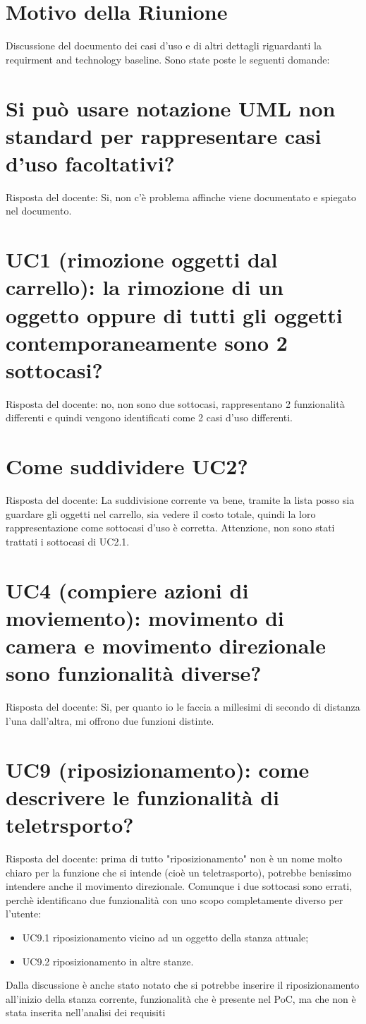 \section{Motivo della Riunione}
Discussione del documento dei casi d'uso e di altri dettagli riguardanti la requirment and technology baseline. Sono state poste le seguenti domande:

\section{Si può usare notazione UML non standard per rappresentare casi d'uso facoltativi?}
Risposta del docente: Si, non c'è problema affinche viene documentato e spiegato nel documento.

\section{UC1 (rimozione oggetti dal carrello): la rimozione di un oggetto oppure di tutti gli oggetti contemporaneamente sono 2 sottocasi?}
Risposta del docente: no, non sono due sottocasi, rappresentano 2 funzionalità differenti e quindi vengono identificati come 2 casi d'uso differenti.

\section{Come suddividere UC2?}
Risposta del docente: La suddivisione corrente va bene, tramite la lista posso sia guardare gli oggetti nel carrello, sia vedere il costo totale, quindi la loro rappresentazione come sottocasi d'uso è corretta. Attenzione, non sono stati trattati i sottocasi di UC2.1.

\section{UC4 (compiere azioni di moviemento): movimento di camera e movimento direzionale sono funzionalità diverse?}
Risposta del docente: Si, per quanto io le faccia a millesimi di secondo di distanza l'una dall'altra, mi offrono due funzioni distinte.

\section{UC9 (riposizionamento): come descrivere le funzionalità di teletrsporto?}
Risposta del docente: prima di tutto "riposizionamento" non è un nome molto chiaro per la funzione che si intende (cioè un teletrasporto), potrebbe benissimo intendere anche il movimento direzionale. Comunque i due sottocasi sono errati, perchè identificano due funzionalità con uno scopo completamente diverso per l'utente:
\begin{itemize}
	\item UC9.1 riposizionamento vicino ad un oggetto della stanza attuale;
	\item UC9.2 riposizionamento in altre stanze.
\end{itemize}
Dalla discussione è anche stato notato che si potrebbe inserire il riposizionamento all'inizio della stanza corrente, funzionalità che è presente nel PoC, ma che non è stata inserita nell'analisi dei requisiti


